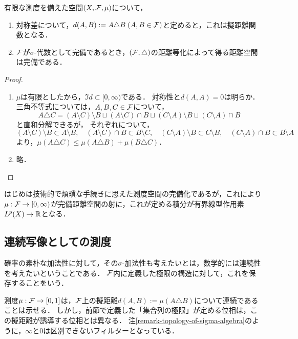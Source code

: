 \documentclass[uplatex,dvipdfmx]{jsreport}
\begin{document}
\begin{lemma}
    有限な測度を備えた空間$(X,\mathcal{F},\mu)$について，
    \begin{enumerate}
        \item 対称差について，$d(A,B):=A\triangle B\;(A,B\in\mathcal{F})$と定めると，これは擬距離関数となる．
        \item $\mathcal{F}$が$\sigma$-代数として完備であるとき，$(\mathcal{F},\triangle)$の距離等化によって得る距離空間は完備である．
    \end{enumerate}
\end{lemma}
\begin{proof}\mbox{}
    \begin{enumerate}
        \item $\mu$は有限としたから，$\Im d\subset[0,\infty)$である．
        対称性と$d(A,A)=0$は明らか．三角不等式については，$A,B,C\in\mathcal{F}$について，
        \[A\triangle C=(A\setminus C)\setminus B\sqcup (A\setminus C)\cap B\sqcup (C\setminus A)\setminus B\sqcup(C\setminus A)\cap B\]と直和分解できるが，
        それぞれについて，
        \[(A\setminus C)\setminus B\subset A\setminus B,\quad(A\setminus C)\cap B\subset B\setminus C,\quad (C\setminus A)\setminus B\subset C\setminus B,\quad(C\setminus A)\cap B\subset B\setminus A\]
        より，$\mu(A\triangle C)\le\mu(A\triangle B)+\mu(B\triangle C)$．
        \item 略．
    \end{enumerate}
\end{proof}
\begin{remarks}
    はじめは技術的で煩瑣な手続きに思えた測度空間の完備化であるが，これにより$\mu:\mathcal{F}\to[0,\infty)$が完備距離空間の射に，これが定める積分が有界線型作用素$L^p(X)\to\mathbb{R}$となる．
\end{remarks}

\subsection{連続写像としての測度}

\begin{tcolorbox}[colframe=ForestGreen, colback=ForestGreen!10!white,breakable,colbacktitle=ForestGreen!40!white,coltitle=black,fonttitle=\bfseries\sffamily,
title=]
    確率の素朴な加法性に対して，その$\sigma$-加法性も考えたいとは，数学的には連続性を考えたいということである．
    $\mathcal{F}$内に定義した極限の構造に対して，これを保存することをいう．

    測度$\mu:\mathcal{F}\to[0,1]$は，$\mathcal{F}$上の擬距離$d(A,B):=\mu(A\triangle B)$について連続であることは示せる．
    しかし，前節で定義した「集合列の極限」が定める位相は，この擬距離が誘導する位相とは異なる．
    注\ref{remark-topology-of-sigma-algebra}のように，$\infty$と$0$は区別できないフィルターとなっている．
\end{tcolorbox}
\end{document}
